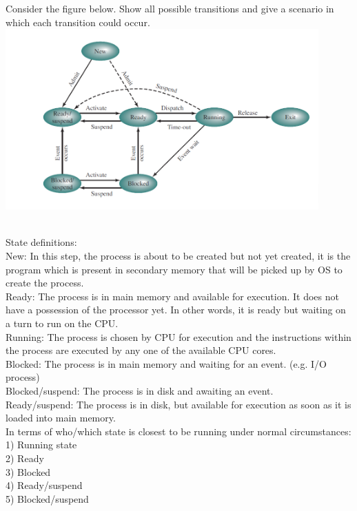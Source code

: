\documentclass[12pt]{article}
\newenvironment{sol}[1][Solution]{\begin{trivlist}\item[\hskip\labelsep {\bfseries #1:}]}{\end{trivlist}}
\begin{document}
\begin{enumerate}
\newpage
\item Consider the figure below. Show all possible transitions and give a scenario in which each transition could occur.\\
    \includegraphics[width=0.9\textwidth]{problem5.png}
\begin{sol}
\hspace*{\fill} \\
State definitions:\\
New: In this step, the process is about to be created but not yet created, it is the program which is present in secondary memory that will be picked up by OS to create the process.\\
Ready: The process is in main memory and available for execution. It does not have a possession of the processor yet. In other words, it is ready but waiting on a turn to run on the CPU.\\
Running: The process is chosen by CPU for execution and the instructions within the process are executed by any one of the available CPU cores.\\
Blocked: The process is in main memory and waiting for an event. (e.g. I/O process)\\
Blocked/suspend: The process is in disk and awaiting an event.\\
Ready/suspend: The process is in disk, but available for execution as soon as it is loaded into main memory.\\
In terms of who/which state is closest to be running under normal circumstances:\\
1) Running state \\
2) Ready \\
3) Blocked \\
4) Ready/suspend \\
5) Blocked/suspend \\


\end{sol}
\end{enumerate}
\end{document}
